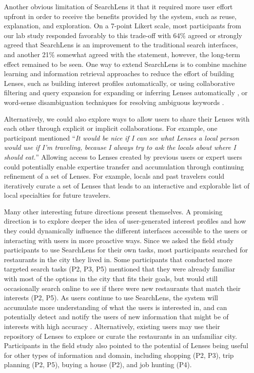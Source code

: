 \documentclass{sigchi}
\begin{document}
Another obvious limitation of SearchLens it that it required more user effort upfront in order to receive the benefits provided by the system, such as reuse, explanation, and exploration. On a 7-point Likert scale, most participants from our lab study responded favorably to this trade-off with 64\% agreed or strongly agreed that SearchLens is an improvement to the traditional search interfaces, and another 21\% somewhat agreed with the statement, however, the long-term effect remained to be seen. One way to extend SearchLens is to combine machine learning and information retrieval approaches to reduce the effort of building Lenses, such as building interest profiles automatically, or using collaborative filtering and query expansion for expanding or inferring Lenses automatically \cite{ahn2007open,sarwar2001item,xu1996query}, or word-sense disambiguation techniques for resolving ambiguous keywords \cite{yarowsky1995unsupervised}.

Alternatively, we could also explore ways to allow users to share their Lenses with each other through explicit or implicit collaborations. For example, one participant mentioned ``\emph{It would be nice if I can see what Lenses a local person would use if I'm traveling, because I always try to ask the locals about where I should eat.}'' Allowing access to Lenses created by previous users or expert users could potentially enable expertise transfer and accumulation through continuing refinement of a set of Lenses. For example, locals and past travelers could iteratively curate a set of Lenses that leads to an interactive and explorable list of local specialties for future travelers.

Many other interesting future directions present themselves. A promising direction is to explore deeper the idea of user-generated interest profiles and how they could dynamically influence the different interfaces accessible to the users or interacting with users in more proactive ways.
Since we asked the field study participants to use SearchLens for their own tasks, most participants searched for restaurants in the city they lived in. Some participants that conducted more targeted search tasks (P2, P3, P5) mentioned that they were already familiar with most of the options in the city that fits their goals, but would still occasionally search online to see if there were new restaurants that match their interests (P2, P5).
As users continue to use SearchLens, the system will accumulate more understanding of what the users is interested in, and can potentially detect and notify the users of new information that might be of interests with high accuracy \cite{yang2006retroactive}.
Alternatively, existing users may use their repository of Lenses to explore or curate the restaurants in an unfamiliar city. Participants in the field study also pointed to the potential of Lenses being useful for other types of information and domain, including shopping (P2, P3), trip planning (P2, P5), buying a house (P2), and job hunting (P4). 
\end{document}
